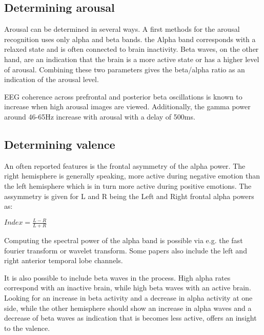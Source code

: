 
\subsection{Determining arousal}

Arousal can be determined in several ways. A first methods for the arousal recognition uses only alpha and beta bands. the Alpha band corresponds with a relaxed state and is often connected to brain inactivity\cite{ExtendedPaper}\cite{RealTimeEEGEmotion}. Beta waves, on the other hand, are an indication that the brain is a more active state or has a higher level of arousal. Combining these two parameters gives the beta/alpha ratio as an indication of the arousal level. 

\npar

EEG coherence across prefrontal and posterior beta oscillations is known to increase when high arousal images are viewed. Additionally, the gamma power around 46-65Hz increase with arousal with a delay of 500ms.

\subsection{Determining valence}
An often reported features is the frontal asymmetry of the alpha power\cite{GivenPaper}.
The right hemisphere is generally speaking, more active during negative emotion than the left hemisphere which is in turn more active during positive emotions\cite{RealTimeEEGEmotion}\cite{EEGDatasets}. The assymmetry is given for L and R being the Left and Right frontal alpha powers as:\\
\begin{center}
$Index = \frac{L-R}{L+R}$
\end{center}
Computing the spectral power of the alpha band is possible via e.g. the fast fourier transform or wavelet transform. Some papers also include the left and right anterior temporal lobe channels.

\npar

It is also possible to include beta waves in the process. High alpha rates correspond with an inactive brain, while high beta waves with an active brain. Looking for an increase in beta activity and a decrease in alpha activity at one side, while the other hemisphere should show an increase in alpha waves and a decrease of beta waves as indication that is becomes less active, offers an insight to the valence\cite{ExtendedPaper}. 

